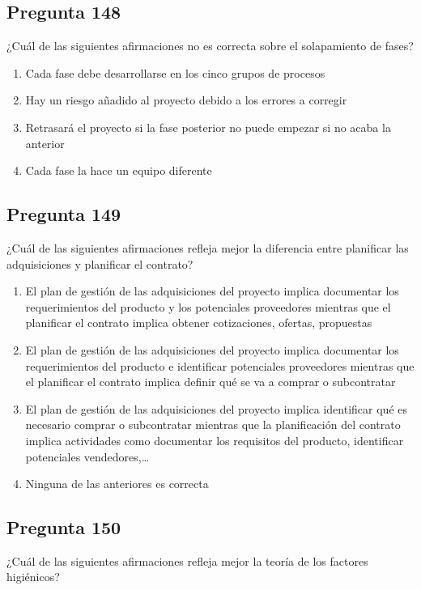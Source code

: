 \documentclass[11pt,a4paper]{article}
\begin{document}
\subsection*{Pregunta 148}
¿Cuál de las siguientes afirmaciones no es correcta sobre el solapamiento de fases?

\begin{enumerate}[label=\alph*)]
  \item Cada fase debe desarrollarse en los cinco grupos de procesos
  \item Hay un riesgo añadido al proyecto debido a los errores a corregir
  \item Retrasará el proyecto si la fase posterior no puede empezar si no acaba la anterior
  \item Cada fase la hace un equipo diferente
\end{enumerate}

\subsection*{Pregunta 149}
¿Cuál de las siguientes afirmaciones refleja mejor la diferencia entre planificar las adquisiciones y planificar el contrato?

\begin{enumerate}[label=\alph*)]
  \item El plan de gestión de las adquisiciones del proyecto implica documentar los requerimientos del producto y los potenciales proveedores mientras que el planificar el contrato implica obtener cotizaciones, ofertas, propuestas
  \item El plan de gestión de las adquisiciones del proyecto implica documentar los requerimientos del producto e identificar potenciales proveedores mientras que el planificar el contrato implica definir qué se va a comprar o subcontratar
  \item El plan de gestión de las adquisiciones del proyecto implica identificar qué es necesario comprar o subcontratar mientras que la planificación del contrato implica actividades como documentar los requisitos del producto, identificar potenciales vendedores,…
  \item Ninguna de las anteriores es correcta
\end{enumerate}

\subsection*{Pregunta 150}
¿Cuál de las siguientes afirmaciones refleja mejor la teoría de los factores higiénicos?
\end{document}
